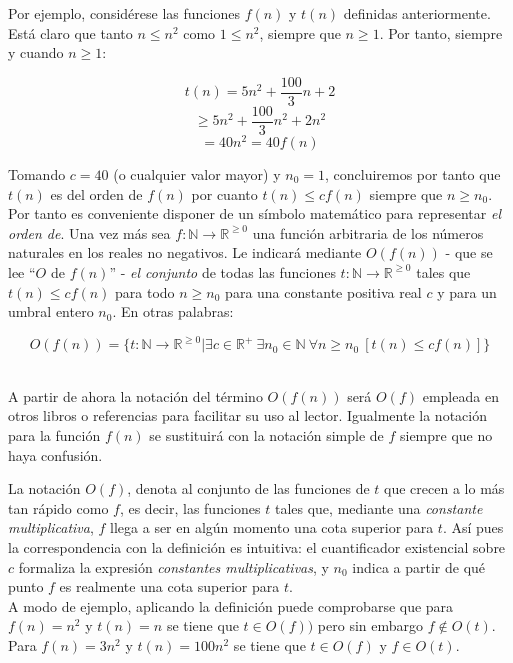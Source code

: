 \documentclass[a4paper,12pt]{article}
\begin{document}
Por ejemplo, considérese las funciones $f(n)$ y $t(n)$ definidas anteriormente. Está claro que tanto $n \leq n^2$ como $1 \leq n^2$, siempre que $n \geq 1$. Por tanto, siempre y cuando $n \geq 1$:

\begin{center}
\[ t(n) = 5n^2 + \frac{100}{3}n + 2 \]
\[ \geq 5n^2 + \frac{100}{3}n^2 + 2n^2 \]
\[ = 40n^2 = 40 f(n) \]
\end{center}

Tomando $c = 40$ (o cualquier valor mayor) y $n_0 = 1$, concluiremos por tanto que $t(n)$ es del orden de $f(n)$ por cuanto $t(n) \leq cf(n)$ siempre que $n \geq n_0$. Por tanto es conveniente disponer de un símbolo matemático para representar \emph{el orden de}. Una vez más sea $f: \mathbb{N} \rightarrow \mathbb{R}^{\geq 0}$ una función arbitraria de los números naturales en los reales no negativos. Le indicará mediante $O(f(n))$ - que se lee ``$O$ de $f(n)$'' - \emph{el conjunto} de todas las funciones $t: \mathbb{N} \rightarrow \mathbb{R}^{\geq 0}$ tales que $t(n) \leq cf(n)$ para todo $n \geq n_0$ para una constante positiva real $c$ y para un umbral entero $n_0$. En otras palabras:
\begin{center}
\[ O(f(n)) = \big\{ t: \mathbb{N} \rightarrow \mathbb{R}^{\geq 0} \big| \exists c \in \mathbb{R}^+\ \exists n_0 \in \mathbb{N}\ \forall n \geq n_0\ [t(n) \leq cf(n)] \big\} \]\\
\end{center}

\begin{nota}
A partir de ahora la notación del término $O(f(n))$ será $O(f)$ empleada en otros libros o referencias para facilitar su uso al lector. Igualmente la notación para la función $f(n)$ se sustituirá con la notación simple de $f$ siempre que no haya confusión.\\
\end{nota}

La notación $O(f)$, denota al conjunto de las funciones de $t$ que crecen a lo más tan rápido como $f$, es decir, las funciones $t$ tales que, mediante una \emph{constante multiplicativa}, $f$ llega a ser en algún momento una cota superior para $t$. Así pues la correspondencia con la definición es intuitiva: el cuantificador existencial sobre $c$ formaliza la expresión \emph{constantes multiplicativas}, y $n_0$ indica a partir de qué punto $f$ es realmente una cota superior para $t$.\\

A modo de ejemplo, aplicando la definición puede comprobarse que para $f(n) = n^2$ y $t(n) = n$ se tiene que $t \in O(f))$ pero sin embargo $f \notin O(t)$. Para $f(n) = 3n^2$ y $t(n) = 100n^2$ se tiene que $t \in O(f)$ y $f \in O(t)$.\\
\end{document}
